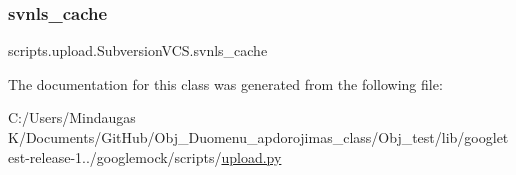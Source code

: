 \subsubsection{\texorpdfstring{svnls\_cache}{svnls\_cache}}
{\footnotesize\ttfamily scripts.\+upload.\+Subversion\+V\+C\+S.\+svnls\+\_\+cache}



The documentation for this class was generated from the following file\+:\begin{DoxyCompactItemize}
\item 
C\+:/\+Users/\+Mindaugas K/\+Documents/\+Git\+Hub/\+Obj\+\_\+\+Duomenu\+\_\+apdorojimas\+\_\+class/\+Obj\+\_\+test/lib/googletest-\/release-\/1../googlemock/scripts/\mbox{\hyperlink{_obj__test_2lib_2googletest-release-1_88_81_2googlemock_2scripts_2upload_8py}{upload.\+py}}\end{DoxyCompactItemize}
